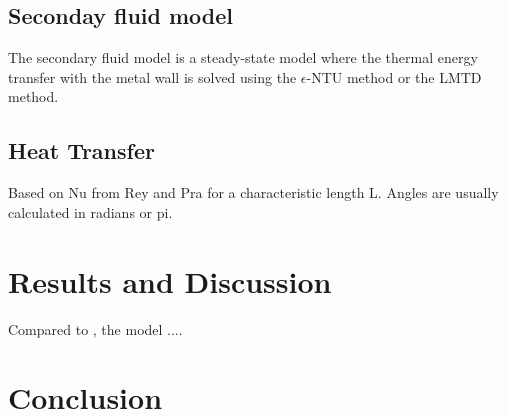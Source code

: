 \documentclass[11pt]{article} %
\newcommand{\clearemptydoublepage}{\newpage{\pagestyle{plain}\cleardoublepage}}
\begin{document}
\subsection{Seconday fluid model}
\label{sec: SeconadryFluid}
The secondary fluid model is a steady-state model where the thermal energy transfer with the metal wall is solved using the $\epsilon$-NTU method or the LMTD method.

\subsection{Heat Transfer}

Based on \gls{Nu} from \gls{Rey} and \gls{Pra} for a characteristic length \gls{L}. Angles are usually calculated in radians or \gls{pi}.




\section{Results and Discussion}

Compared to \cite{Kaern2011b}, the model .... 


\cite{Zhang2006}

\cite{Zhang2009}

\section{Conclusion}


\clearemptydoublepage

\clearemptydoublepage









\end{document}
